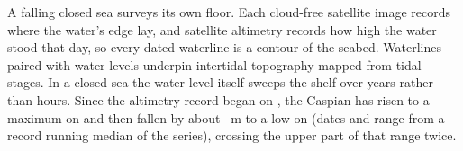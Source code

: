 A falling closed sea surveys its own floor. Each cloud-free satellite image records where the water's edge lay, and satellite altimetry records how high the water stood that day, so every dated waterline is a contour of the seabed. Waterlines paired with water levels underpin intertidal topography mapped from tidal stages\citep{sagar2017,bishoptaylor2019}. In a closed sea the water level itself sweeps the shelf over years rather than hours. Since the altimetry record began on , the Caspian has risen to a maximum on  and then fallen by about ~m to a low on  (dates and range from a -record running median of the series), crossing the upper part of that range twice.
